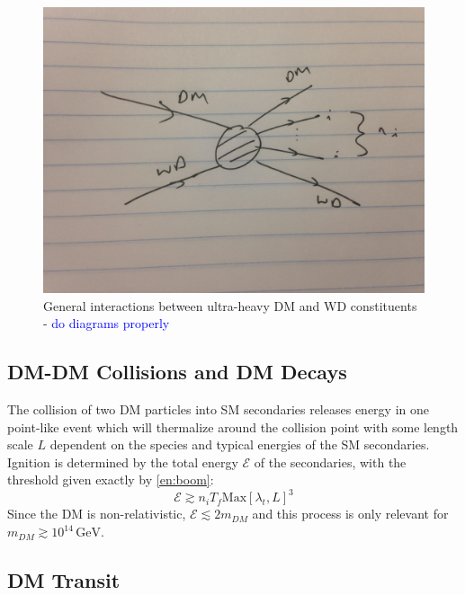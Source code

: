 \documentclass[twocolumn,showpacs,preprintnumbers,amsmath,amssymb,prd]{revtex4}
\newcommand{\GeV}{\text{GeV}}
\begin{document}
\begin{figure}
\label{feynman}
\includegraphics[scale=.05]{feynmandiag}
\caption{General interactions between ultra-heavy DM and WD constituents - \textcolor{blue}{do diagrams properly}}
\end{figure}

\subsection{DM-DM Collisions and DM Decays}

The collision of two DM particles into SM secondaries releases energy in one point-like event which will thermalize around the collision point with some length scale $L$ dependent on the species and typical energies of the SM secondaries.  Ignition is determined by the total energy $\mathcal{E}$ of the secondaries, with the threshold given exactly by \eqref{en:boom}:
\[
    \mathcal{E} \gtrsim n_i T_f \text{Max}\left[\lambda_t, L\right]^3
\]
Since the DM is non-relativistic, $\mathcal{E} \lesssim 2 m_{DM}$ and this process is only relevant for $m_{DM} \gtrsim 10^{14} \, \GeV$.


\subsection{DM Transit}
\end{document}
